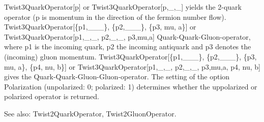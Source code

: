 



Twist3QuarkOperator[p] or { }Twist3QuarkOperator[p,\_{},\_{}] { }yields the { }2-quark operator (p is momentum in the direction of the
  fermion number flow). Twist3QuarkOperator[\{p1,\_{}\_{}\_{}\}, \{p2,\_{}\_{}\_{}\}, \{p3, mu, a\}] or Twist3QuarkOperator[p1,\_{},\_{},
  { }p2,\_{},\_{}, { }p3,mu,a] Quark-Quark-Gluon-operator, where p1 is the incoming quark, p2 the incoming antiquark and p3 denotes the
  (incoming) gluon momentum. { }Twist3QuarkOperator[\{p1,\_{}\_{}\_{}\}, \{p2,\_{}\_{}\_{}\}, \{p3, mu, a\}, \{p4, nu, b\}] or
  Twist3QuarkOperator[p1,\_{},\_{}, { }p2,\_{},\_{}, { }p3,mu,a, p4, nu, b] { }gives the Quark-Quark-Gluon-Gluon-operator. The setting of
  the option Polarization (unpolarized: 0; polarized: 1) determines whether the uppolarized or polarized operator is returned.



See also:  Twist2QuarkOperator, Twist2GluonOperator.




